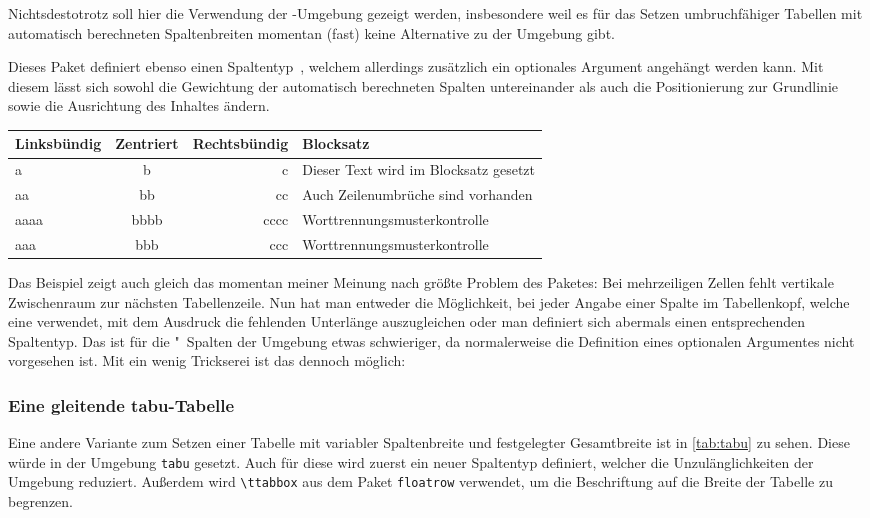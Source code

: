 \documentclass[%
  english,ngerman,%
  geometry=no,DIV=12,automark,%
]{tudscrartcl}
\makeatletter
\newcommand*\pcolumnfuzz[1]{\pretocmd{\@endpbox}{\hfuzz=#1}{}{}}
\makeatother
\begin{document}
Nichtsdestotrotz soll hier die Verwendung der -Umgebung 
gezeigt werden, insbesondere weil es für das Setzen umbruchfähiger Tabellen mit 
automatisch berechneten Spaltenbreiten momentan (fast) keine Alternative zu der 
Umgebung  gibt. 

Dieses Paket definiert ebenso einen Spaltentyp~, welchem allerdings 
zusätzlich ein optionales Argument angehängt werden kann. Mit diesem lässt sich 
sowohl die Gewichtung der automatisch berechneten Spalten untereinander als 
auch die Positionierung zur Grundlinie sowie die Ausrichtung des Inhaltes 
ändern.
%
\begingroup
\pcolumnfuzz{70pt}
\begin{Hint*}
\begin{tabu} to 11.7cm {lcrX}
\toprule
\textbf{Linksbündig} & \textbf{Zentriert} & 
\textbf{Rechtsbündig} & \textbf{Blocksatz} \tabularnewline
\midrule
a    & b    & c    & Dieser Text wird im Blocksatz gesetzt\tabularnewline
aa   & bb   & cc   & Auch Zeilenumbrüche sind vorhanden\tabularnewline
aaaa & bbbb & cccc & Worttrennungsmus\-terkontrolle\tabularnewline
aaa  & bbb  & ccc  & Worttrennungsmusterkontrolle\tabularnewline
\bottomrule
\end{tabu}
\end{Hint*}
\endgroup
%
Das Beispiel zeigt auch gleich das momentan meiner Meinung nach größte Problem 
des Paketes: Bei mehrzeiligen Zellen fehlt vertikale Zwischenraum zur nächsten 
Tabellenzeile. Nun hat man entweder die Möglichkeit, bei jeder Angabe einer 
Spalte im Tabellenkopf, welche eine  verwendet, mit dem Ausdruck 
 die fehlenden Unterlänge auszugleichen oder man 
definiert sich abermals einen entsprechenden Spaltentyp. Das ist für die 
"~Spalten der Umgebung  etwas schwieriger, da 
 normalerweise die Definition eines optionalen Argumentes 
nicht vorgesehen ist. Mit ein wenig Trickserei ist das dennoch möglich:
%
\begin{Trunk+}
\subsubsection{Eine gleitende tabu-Tabelle}
Eine andere Variante zum Setzen einer Tabelle mit variabler Spaltenbreite 
und festgelegter Gesamtbreite ist in \autoref{tab:tabu} zu sehen. Diese 
würde in der Umgebung \texttt{tabu} gesetzt. Auch für diese wird zuerst 
ein neuer Spaltentyp definiert, welcher die Unzulänglichkeiten der 
Umgebung reduziert. Außerdem wird \texttt{\textbackslash ttabbox} aus dem 
Paket \texttt{floatrow} verwendet, um die Beschriftung auf die Breite der 
Tabelle zu begrenzen.

\end{Trunk+}
\end{document}
